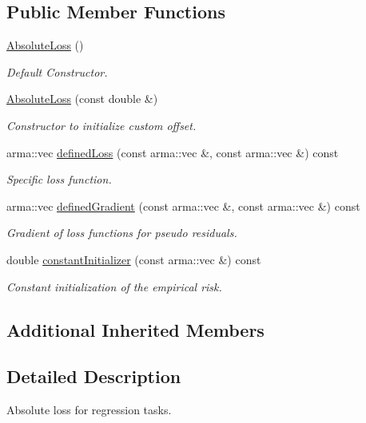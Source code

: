 \subsection*{Public Member Functions}
\begin{DoxyCompactItemize}
\item 
\mbox{\hyperlink{classloss_1_1_absolute_loss_a4b1416147d0573079f9d652097c1ab81}{Absolute\+Loss}} ()
\begin{DoxyCompactList}\small\item\em Default Constructor. \end{DoxyCompactList}\item 
\mbox{\hyperlink{classloss_1_1_absolute_loss_a3e056fbde0b63527bb9aadb0a4a8547a}{Absolute\+Loss}} (const double \&)
\begin{DoxyCompactList}\small\item\em Constructor to initialize custom offset. \end{DoxyCompactList}\item 
arma\+::vec \mbox{\hyperlink{classloss_1_1_absolute_loss_acfef6f0de3cfcccebd4bbfc04133cf1e}{defined\+Loss}} (const arma\+::vec \&, const arma\+::vec \&) const
\begin{DoxyCompactList}\small\item\em Specific loss function. \end{DoxyCompactList}\item 
arma\+::vec \mbox{\hyperlink{classloss_1_1_absolute_loss_a1886fc8ca065c6f0a207b7a8a0f8444d}{defined\+Gradient}} (const arma\+::vec \&, const arma\+::vec \&) const
\begin{DoxyCompactList}\small\item\em Gradient of loss functions for pseudo residuals. \end{DoxyCompactList}\item 
double \mbox{\hyperlink{classloss_1_1_absolute_loss_aa2ac5fb1fdf3ce0f48decd77d375ef76}{constant\+Initializer}} (const arma\+::vec \&) const
\begin{DoxyCompactList}\small\item\em Constant initialization of the empirical risk. \end{DoxyCompactList}\end{DoxyCompactItemize}
\subsection*{Additional Inherited Members}


\subsection{Detailed Description}
Absolute loss for regression tasks. 

